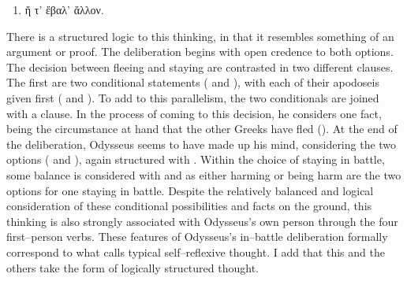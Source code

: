 \documentclass[12pt,letterpaper,oneside,final]{memoir}
\begin{document}
\begin{greek}
\begin{enumerate}
\begin{enumerate}
\begin{enumerate}
\begin{enumerate}
      \item ἤ τ' ἔβαλ' ἄλλον.
      \end{enumerate}
    \end{enumerate}
  \end{enumerate}
\end{enumerate} \DoubleSpacing \end{greek} There is a structured logic to this thinking, in that it resembles something of an argument or proof. The deliberation begins with open credence to both options. The decision between fleeing and staying are contrasted in two different clauses. The first are two conditional statements ( and ), with each of their apodoseis given first ( and ). To add to this parallelism, the two conditionals are joined with a  clause. In the process of coming to this decision, he considers one fact, being the circumstance at hand that the other Greeks have fled (). At the end of the deliberation, Odysseus seems to have made up his mind, considering the two options ( and ), again structured with . Within the choice of staying in battle, some balance is considered with  and  as either harming or being harm are the two options for one staying in battle. Despite the relatively balanced and logical consideration of these conditional possibilities and facts on the ground, this thinking is also strongly associated with Odysseus's own person through the four first--person verbs. These features of Odysseus's in--battle deliberation formally correspond to what \textcite{scully1984} calls typical self--reflexive thought. I add that this and the others take the form of logically structured thought.
\end{document}
